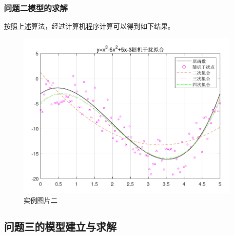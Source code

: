 \documentclass[nogbt]{my_cumcmthesis}
\begin{document}
\subsubsection{问题二模型的求解}
    按照上述算法，经过计算机程序计算可以得到如下结果。
    \begin{figure}[htbp]
        \centering
        \includegraphics[scale=0.8]{source/FunctionFitting.pdf}
        \caption{实例图片二}
        \label{fig:eg2}
    \end{figure}

\subsection{问题三的模型建立与求解}
\end{document}
